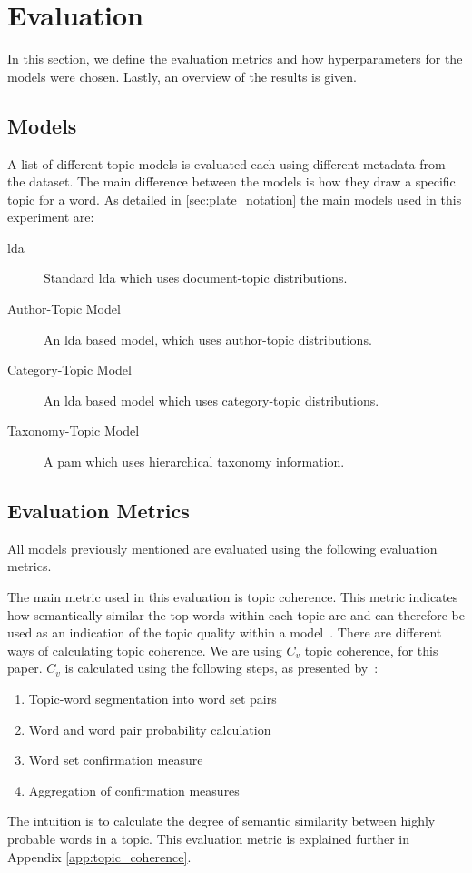 \section{Evaluation}\label{sec:experiment}
In this section, we define the evaluation metrics and how hyperparameters for the models were chosen.
Lastly, an overview of the results is given.

\subsection{Models}\label{sec:experiment_models}
A list of different topic models is evaluated each using different metadata from the dataset.
The main difference between the models is how they draw a specific topic for a word.
As detailed in \autoref{sec:plate_notation} the main models used in this experiment are:
\begin{description}
	\item[\Acrlong{lda}] Standard \gls{lda} which uses document-topic distributions.
	\item[Author-Topic Model]\cite{author_topic_2012} An \gls{lda} based model, which uses author-topic distributions.
	\item[Category-Topic Model] An \gls{lda} based model which uses category-topic distributions.
	\item[Taxonomy-Topic Model] A \acrlong{pam} which uses hierarchical taxonomy information.
\end{description}

\subsection{Evaluation Metrics}\label{sec:experiment_metrics}
All models previously mentioned are evaluated using the following evaluation metrics.

The main metric used in this evaluation is topic coherence.
This metric indicates how semantically similar the top words within each topic are and can therefore be used as an indication of the topic quality within a model~\cite{topic_coherence_2015}.
There are different ways of calculating topic coherence.
We are using $C_v$ topic coherence, for this paper.
$C_v$ is calculated using the following steps, as presented by~\citet{Syed2017coherence}:
\begin{enumerate}
	\item Topic-word segmentation into word set pairs
	\item Word and word pair probability calculation
	\item Word set confirmation measure
	\item Aggregation of confirmation measures
\end{enumerate}
The intuition is to calculate the degree of semantic similarity between highly probable words in a topic.
This evaluation metric is explained further in Appendix \autoref{app:topic_coherence}.

